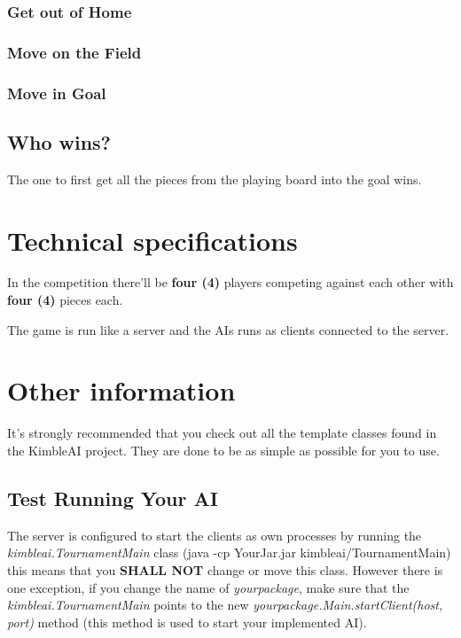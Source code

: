 \documentclass[10pt,a4paper]{article}
\begin{document}
\subsubsection{Get out of Home}

\subsubsection{Move on the Field}

\subsubsection{Move in Goal}


\subsection{Who wins?}

The one to first get all the pieces from the playing board into the goal wins.



\section{Technical specifications}
\label{sec:tech-specs}


In the competition there'll be \textbf{four (4)} players competing against each other with \textbf{four (4)} pieces each.

The game is run like a server and the AIs runs as clients connected to the server.



\section{Other information}
\label{sec:other-info}


It's strongly recommended that you check out all the template classes found in the KimbleAI project. They are done to be as simple as possible for you to use.

\subsection{Test Running Your AI}

The server is configured to start the clients as own processes by running the \textit{kimbleai.TournamentMain} class (java -cp YourJar.jar kimbleai/TournamentMain) this means that you \textbf{SHALL NOT} change or move this class. However there is one exception, if you change the name of \textit{yourpackage}, make sure that the \textit{kimbleai.TournamentMain} points to the new \textit{yourpackage.Main.startClient(host, port)} method (this method is used to start your implemented AI).
\end{document}
